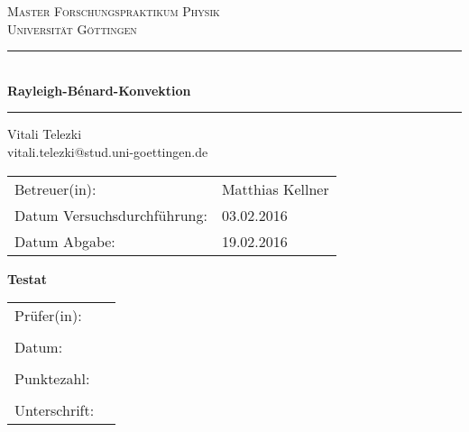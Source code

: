 \documentclass[12pt, a4paper, titlepage, ngerman]{article}
\begin{document}
\begin{titlepage}
\thispagestyle{fancy}
\fancyhf{}


\doublespacing
\vspace*{1.1cm}
\centering
\textsc{\large Master Forschungspraktikum Physik \\Universität Göttingen}

\vspace*{0.6cm}
\rule{\textwidth}{1pt}\\[0.5cm]
{\huge \bfseries
        Rayleigh-B\'{e}nard-Konvektion\\[1.5ex]
}
\rule{\textwidth}{1pt}
\large{Vitali Telezki \\ vitali.telezki@stud.uni-goettingen.de}
\vspace*{1.1cm}
\begin{table}[h]
\begin{flushleft}
\begin{tabular}{ll}
        Betreuer(in): & Matthias Kellner\\
        Datum Versuchsdurchführung: & 03.02.2016 \\
        Datum Abgabe: & 19.02.2016\\
\end{tabular}
\end{flushleft}
\end{table}

{\bfseries Testat}
\begin{table}[h]
\begin{flushleft}
\begin{tabular}{ll}
        Prüfer(in): & \\ \\
        Datum: & \\ \\
        Punktezahl:&\\ \\
        Unterschrift: &
\end{tabular}
\end{flushleft}
\end{table}


\end{titlepage}

\tableofcontents
\newpage
\doublespacing


%


\FloatBarrier
\appendix

\end{document}
